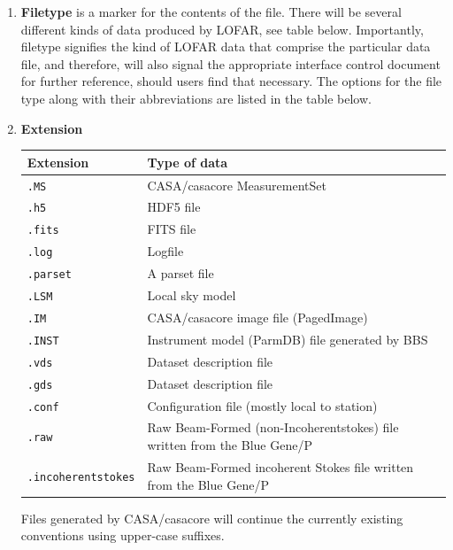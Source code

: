 \documentclass[a4paper,10pt,bibtotoc]{scrartcl}
\begin{document}
\begin{enumerate}
  The ``P" (Part) parameter holds the number of parts/slits the
  Beam-Formed coherentstokes data files will be split by frequency
  range.  It is anticipated that the typical 240 subbands will be
  evenly split into 8 sections (to match the number of cores for ease
  of processing).  Each of these 8 sections will have a unique part
  number. 
  
  The ``SBG" (Subband Group) parameter is used when data from more than one subband is combined into one output dataproduct. This is then enumerated using the Subband Group index.
  
\item \textbf{Filetype} is a marker for the contents of the
  file. There will be several different kinds of data produced by
  LOFAR, see table below. Importantly, filetype signifies the kind of
  LOFAR data that comprise the particular data file, and therefore,
  will also signal the appropriate interface control document for
  further reference, should users find that necessary. The options for
  the file type along with their abbreviations are listed in the table below.
  
  
\item \textbf{Extension}
  \begin{center}
    \begin{tabular}{|lp{11cm}|}
      \hline
      \textbf{Extension} & \textbf{Type of data} \\
      \hline \hline
      \verb|.MS|     & CASA/casacore MeasurementSet \\
      \verb|.h5|     & HDF5 file \\
      \verb|.fits|   & FITS file \\
      \verb|.log|    & Logfile \\
      \verb|.parset| & A parset file \\
      \verb|.LSM|    & Local sky model \\
      \verb|.IM|     & CASA/casacore image file (PagedImage) \\
      \verb|.INST|     & Instrument model (ParmDB) file generated by BBS \\
      \verb|.vds|    & Dataset description file \\
      \verb|.gds|    & Dataset description file \\
      \verb|.conf|   & Configuration file (mostly local to station) \\
      \verb|.raw|    & Raw Beam-Formed (non-Incoherentstokes) file
      written from the Blue Gene/P \\
      \verb|.incoherentstokes| & Raw Beam-Formed incoherent Stokes
      file written from the Blue Gene/P \\
      \hline
    \end{tabular}
  \end{center}
  Files generated by CASA/casacore will continue the currently
  existing conventions using upper-case suffixes.
\end{enumerate}
\end{document}
